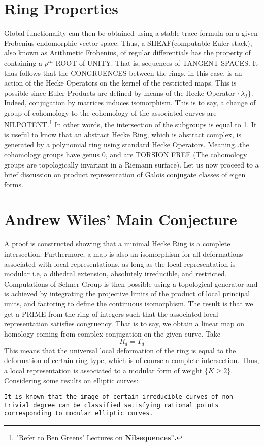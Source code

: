 \documentclass[11pt,fancy]{elegantbook}
\begin{document}
\section{Ring Properties}
Global functionality can then be obtained using a stable trace formula on a given Frobenius endomorphic vector space. Thus, a SHEAF(computable Euler stack), also known as Arithmetic Frobenius, of regular differentials has the property of containing a $p^{th}$ ROOT of UNITY. That is, sequences of TANGENT SPACES. 
It thus follows that the CONGRUENCES between the rings, in this case, is an action of the Hecke Operators on the kernel of the restricted maps. This is possible since Euler Products are defined by means of the Hecke Operator $\{\lambda_f\}$.
Indeed, conjugation by matrices induces isomorphism. This is to say, a change of group of cohomology to the cohomology of the associated curves are NILPOTENT.\footnote{"Refer to Ben Greens' Lectures on \textbf{Nilsequences".}} In other words, the intersection of the subgroups is equal to 1. It is useful to know that an abstract Hecke Ring, which is abstract complex, is generated by a polynomial ring using standard Hecke Operators. Meaning\dots the cohomology groups have genus 0, and are TORSION FREE (The cohomology groups are topologically invariant in a Riemann surface).
Let us now proceed to a brief discussion on product representation of Galois conjugate classes of eigen forms.


\section{Andrew Wiles' Main Conjecture}
A proof is constructed showing that a minimal Hecke Ring is a complete intersection. Furthermore, a map is also an isomorphism for all deformations associated with local representations, as long as the local representation is modular i.e, a dihedral extension, absolutely irreducible, and restricted.
Computations of Selmer Group is then possible using a topological generator and is achieved by integrating the projective limits of the product of local principal units, and factoring to define the continuous isomorphism.
The result is that we get a PRIME from the ring of integers such that the associated local representation satisfies congruency. That is to say, we obtain a linear map on homology coming from complex conjugation on the given curve. Take
\begin{equation}
R_d = T_d
\end{equation}
This means that the universal local deformation of the ring is equal to the deformation of certain ring type, which is of course a complete intersection. Thus, a local representation is associated to a modular form of weight $\{K\ge2\}$.
Considering some results on elliptic curves: 
\begin{lstlisting}
It is known that the image of certain irreducible curves of non-trivial degree can be classified satisfying rational points corresponding to modular elliptic curves.
\end{lstlisting}
\end{document}
